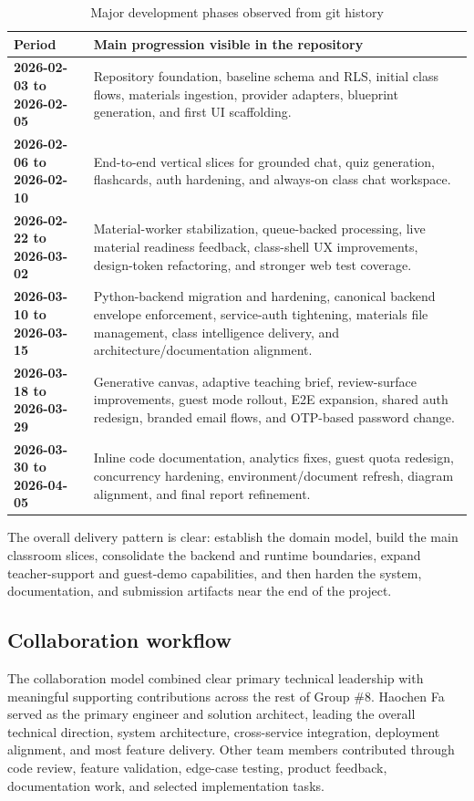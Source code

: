 \documentclass[11pt,a4paper]{article}
\newcommand{\GroupNumber}{8}
\begin{document}
\begin{table}[H]
\centering
\caption{Major development phases observed from git history}
\label{tab:timeline}
\begin{tabularx}{\textwidth}{>{\bfseries}p{2.8cm}X}
\toprule
Period & Main progression visible in the repository \\
\midrule
2026-02-03 to 2026-02-05 & Repository foundation, baseline schema and RLS, initial class flows, materials ingestion, provider adapters, blueprint generation, and first UI scaffolding. \\
2026-02-06 to 2026-02-10 & End-to-end vertical slices for grounded chat, quiz generation, flashcards, auth hardening, and always-on class chat workspace. \\
2026-02-22 to 2026-03-02 & Material-worker stabilization, queue-backed processing, live material readiness feedback, class-shell UX improvements, design-token refactoring, and stronger web test coverage. \\
2026-03-10 to 2026-03-15 & Python-backend migration and hardening, canonical backend envelope enforcement, service-auth tightening, materials file management, class intelligence delivery, and architecture/documentation alignment. \\
2026-03-18 to 2026-03-29 & Generative canvas, adaptive teaching brief, review-surface improvements, guest mode rollout, E2E expansion, shared auth redesign, branded email flows, and OTP-based password change. \\
2026-03-30 to 2026-04-05 & Inline code documentation, analytics fixes, guest quota redesign, concurrency hardening, environment/document refresh, diagram alignment, and final report refinement. \\
\bottomrule
\end{tabularx}
\end{table}

The overall delivery pattern is clear: establish the domain model, build the main classroom slices,
consolidate the backend and runtime boundaries, expand teacher-support and guest-demo capabilities,
and then harden the system, documentation, and submission artifacts near the end of the project.

\subsection{Collaboration workflow}

The collaboration model combined clear primary technical leadership with meaningful supporting
contributions across the rest of Group \#\GroupNumber. Haochen Fa served as the primary engineer
and solution architect, leading the overall technical direction, system architecture, cross-service
integration, deployment alignment, and most feature delivery. Other team members contributed through
code review, feature validation, edge-case testing, product feedback, documentation work, and
selected implementation tasks.
\end{document}
